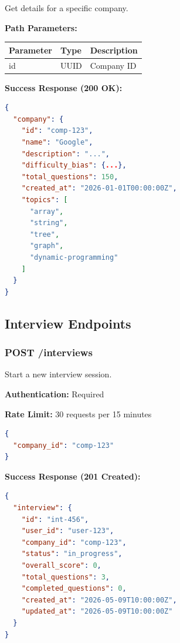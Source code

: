 \documentclass[12pt,a4paper,oneside]{article}
\begin{document}
Get details for a specific company.

\textbf{Path Parameters:}

\begin{table}[H]
\centering
\begin{tabular}{|p{2cm}|p{2cm}|p{8cm}|}
\hline
\textbf{Parameter} & \textbf{Type} & \textbf{Description} \\
\hline
id & UUID & Company ID \\
\hline
\end{tabular}
\end{table}

\textbf{Success Response (200 OK):}

\begin{lstlisting}[language=JSON]
{
  "company": {
    "id": "comp-123",
    "name": "Google",
    "description": "...",
    "difficulty_bias": {...},
    "total_questions": 150,
    "created_at": "2026-01-01T00:00:00Z",
    "topics": [
      "array",
      "string",
      "tree",
      "graph",
      "dynamic-programming"
    ]
  }
}
\end{lstlisting}

\subsection{Interview Endpoints}

\subsubsection{POST /interviews}

Start a new interview session.

\textbf{Authentication:} Required

\textbf{Rate Limit:} 30 requests per 15 minutes

\begin{lstlisting}[language=JSON, caption=Request Body]
{
  "company_id": "comp-123"
}
\end{lstlisting}

\textbf{Success Response (201 Created):}

\begin{lstlisting}[language=JSON, caption=Response 201]
{
  "interview": {
    "id": "int-456",
    "user_id": "user-123",
    "company_id": "comp-123",
    "status": "in_progress",
    "overall_score": 0,
    "total_questions": 3,
    "completed_questions": 0,
    "created_at": "2026-05-09T10:00:00Z",
    "updated_at": "2026-05-09T10:00:00Z"
  }
}
\end{lstlisting}
\end{document}
